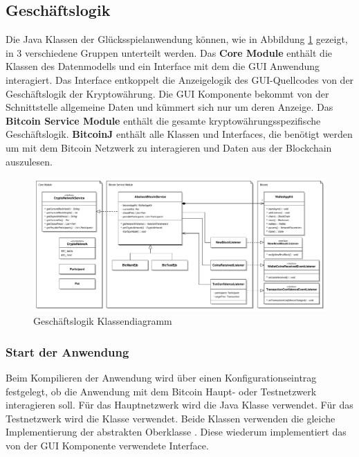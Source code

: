 \subsection{Geschäftslogik}

Die Java Klassen der Glücksspielanwendung können, wie in Abbildung \ref{fig:btc_businesslogic} gezeigt, in 3 verschiedene Gruppen unterteilt werden. Das \textbf{Core Module} enthält die Klassen des Datenmodells und ein Interface mit dem die GUI Anwendung interagiert. 
\newpage
\noindent Das Interface entkoppelt die Anzeigelogik des GUI-Quellcodes von der Geschäftslogik der Kryptowährung. Die GUI Komponente bekommt von der Schnittstelle allgemeine Daten und kümmert sich nur um deren Anzeige.
Das \textbf{Bitcoin Service Module} enthält die gesamte kryptowährungsspezifische Geschäftslogik. \textbf{BitcoinJ} enthält alle Klassen und Interfaces, die benötigt werden um mit dem Bitcoin Netzwerk zu interagieren und Daten aus der Blockchain auszulesen.

\begin{figure}[H]
\centering
\includegraphics[width=1\linewidth]{Figures/umsetzung_btc/btc_businesslogic_pdf}
\decoRule
\caption{Geschäftslogik Klassendiagramm}
\label{fig:btc_businesslogic}
\end{figure}

\subsubsection{Start der Anwendung}
Beim Kompilieren der Anwendung wird über einen Konfigurationseintrag festgelegt, ob die Anwendung mit dem Bitcoin Haupt- oder Testnetzwerk interagieren soll.
Für das Hauptnetzwerk wird die Java Klasse  verwendet. Für das Testnetzwerk wird die Klasse  verwendet. Beide Klassen verwenden die gleiche Implementierung der abstrakten Oberklasse . Diese wiederum implementiert das von der GUI Komponente verwendete  Interface.

